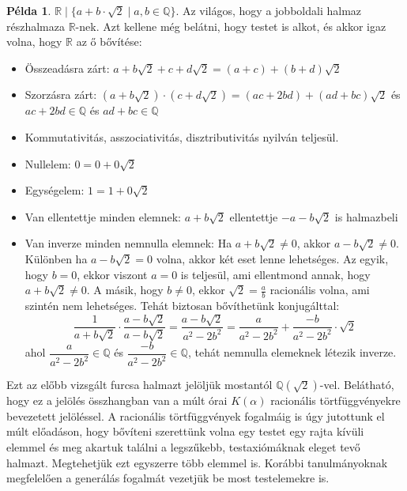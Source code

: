 \documentclass[12pt]{book}
\theoremstyle{plain} %
\theoremstyle{definition} %
\newtheorem{pl}{Példa}[section]
\theoremstyle{remark}
\numberwithin{equation}{section}  %
\begin{document}
	\begin{pl}
		$ \mathbb{R} \mid \{ a+b\cdot \sqrt{2} \mid a,b\in \mathbb{Q}  \} $.
		Az világos, hogy a jobboldali halmaz részhalmaza $\mathbb{R}$-nek. Azt kellene még belátni, hogy testet is alkot, és akkor igaz volna, hogy $\mathbb{R}$ az ő bővítése:
		\begin{itemize}
			\item Összeadásra zárt: $a+b\sqrt{2}+c+d\sqrt{2} = (a+c)+(b+d)\sqrt{2}$
			\item Szorzásra zárt: $(a+b\sqrt{2})\cdot(c+d\sqrt{2})= (ac+2bd)+(ad+bc)\sqrt{2}$ és $ac+2bd\in \mathbb{Q}$ és $ad+bc\in \mathbb{Q}$
			\item Kommutativitás, asszociativitás, disztributivitás nyilván teljesül.
			\item Nullelem: $0=0+0\sqrt{2}$
			\item Egységelem: $1 = 1+0\sqrt{2}$
			\item Van ellentettje minden elemnek: $a+b\sqrt{2}$ ellentettje $-a-b\sqrt{2}$ is halmazbeli
			\item Van inverze minden nemnulla elemnek: Ha $a+b\sqrt{2}\neq 0$, akkor $a-b\sqrt{2}\neq 0$. Különben ha $a-b\sqrt{2}=0$ volna, akkor két eset lenne lehetséges. Az egyik, hogy $b=0$, ekkor viszont $a=0$ is teljesül, ami ellentmond annak, hogy $a+b\sqrt{2}\neq 0$. A másik, hogy $b\neq 0$, ekkor $\sqrt{2} = \frac{a}{b}$ racionális volna, ami szintén nem lehetséges. Tehát biztosan bővíthetünk konjugálttal:
			\[ \dfrac{1}{a+b\sqrt{2}} \cdot \dfrac{a-b\sqrt{2}}{a-b\sqrt{2}} = \dfrac{a-b\sqrt{2}}{a^2-2b^2} = \dfrac{a}{a^2-2b^2} + \dfrac{-b}{a^2-2b^2} \cdot \sqrt{2} \]
			ahol $\dfrac{a}{a^2-2b^2} \in \mathbb{Q}$ és $\dfrac{-b}{a^2-2b^2} \in \mathbb{Q}$, tehát nemnulla elemeknek létezik inverze.
		\end{itemize}
	\end{pl}

	Ezt az előbb vizsgált furcsa halmazt jelöljük mostantól $\mathbb{Q}(\sqrt{2})$-vel. Belátható, hogy ez a jelölés összhangban van a múlt órai $K(\alpha)$ racionális törtfüggvényekre bevezetett jelöléssel. A racionális törtfüggvények fogalmáig is úgy jutottunk el múlt előadáson, hogy bővíteni szerettünk volna egy testet egy rajta kívüli elemmel és meg akartuk találni a legszűkebb, testaxiómáknak eleget tevő halmazt. Megtehetjük ezt egyszerre több elemmel is. Korábbi tanulmányoknak megfelelően a generálás fogalmát vezetjük be most testelemekre is.
	
\end{document}
